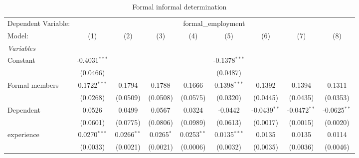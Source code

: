 
\begin{table}[htbp]
   \caption{Formal informal determination}
   \centering
   \begin{tabular}{lcccccccc}
      \tabularnewline \midrule \midrule
      Dependent Variable: & \multicolumn{8}{c}{formal\_employment}\\
      Model:                    & (1)                     & (2)                     & (3)                     & (4)                     & (5)                     & (6)                     & (7)                     & (8)\\  
      \midrule
      \emph{Variables}\\
      Constant                  & -0.4031$^{***}$         &                         &                         &                         & -0.1378$^{***}$         &                         &                         &   \\   
                                & (0.0466)                &                         &                         &                         & (0.0487)                &                         &                         &   \\   
      Formal members            & 0.1722$^{***}$          & 0.1794                  & 0.1788                  & 0.1666                  & 0.1398$^{***}$          & 0.1392                  & 0.1394                  & 0.1311\\   
                                & (0.0268)                & (0.0509)                & (0.0508)                & (0.0575)                & (0.0320)                & (0.0445)                & (0.0435)                & (0.0353)\\   
      Dependent                 & 0.0526                  & 0.0499                  & 0.0567                  & 0.0324                  & -0.0442                 & -0.0439$^{**}$          & -0.0472$^{**}$          & -0.0625$^{**}$\\   
                                & (0.0601)                & (0.0775)                & (0.0806)                & (0.0989)                & (0.0613)                & (0.0017)                & (0.0015)                & (0.0020)\\   
      experience                & 0.0270$^{***}$          & 0.0266$^{**}$           & 0.0265$^{*}$            & 0.0253$^{**}$           & 0.0135$^{***}$          & 0.0135                  & 0.0135                  & 0.0114\\   
                                & (0.0033)                & (0.0021)                & (0.0021)                & (0.0006)                & (0.0032)                & (0.0035)                & (0.0036)                & (0.0046)\\   

\end{tabular}
\end{table}
